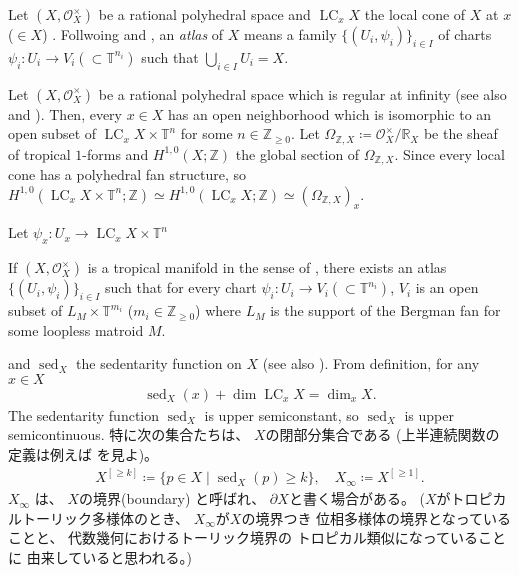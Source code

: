 \documentclass[a4paper,dvipdfmx,reqno,12pt]{amsart}
\theoremstyle{definition}
\newcommand{\deq}{\coloneqq}
\newcommand{\opn}[1]{\operatorname{#1}}
\numberwithin{equation}{section}
\begin{document}
Let $(X,\mathcal{O}_X^{\times})$ be a rational polyhedral space
and $\opn{LC}_x X$ the local cone of $X$ at $x$ ($\in X$)
\cite[]{MR4637248}.
Follwoing \cite[Definition 7.1.8]{mikhalkin2018tropical} and 
\cite[Definition 2.3]{demedrano2023chern},
an \emph{atlas} of $X$ means a family 
$\{(U_i,\psi_i)\}_{i\in I}$ of charts 
$\psi_i\colon U_i\to V_i (\subset \mathbb{T}^{n_i})$
\cite[Definition 2.2]{MR4637248}
such that $\bigcup_{i\in I}U_i=X$.

Let $(X,\mathcal{O}_X^{\times})$ be
a rational polyhedral space which is regular at
infinity \cite[]{MR4637248}
(see also \cite[Definition 1.2]{MR3330789}
and \cite[Definition 7.2.4]{mikhalkin2018tropical}).
Then, every $x\in X$ has an open neighborhood
which is isomorphic to an open subset of 
$\opn{LC}_x X\times \mathbb{T}^n$ for some
$n\in \mathbb{Z}_{\geq 0}$.
Let $\Omega_{\mathbb{Z},X}\deq
\mathcal{O}_X^{\times}/\mathbb{R}_X$ be
the sheaf of tropical $1$-forms and
$H^{1,0}(X;\mathbb{Z})$ the global section of 
$\Omega_{\mathbb{Z},X}$.
Since every local cone has a polyhedral fan structure,
so $H^{1,0}(\opn{LC}_x X\times \mathbb{T}^n;\mathbb{Z})
\simeq H^{1,0}(\opn{LC}_x X;\mathbb{Z})\simeq 
(\Omega_{\mathbb{Z},X})_x$.

Let $\psi_x\colon U_x \to \opn{LC}_x X\times \mathbb{T}^n$

If $(X,\mathcal{O}_X^{\times})$ is a tropical manifold
in the sense of \cite[Definition 6.1]{gross2019sheaftheoretic},
there exists an atlas $\{(U_i,\psi_i)\}_{i\in I}$
such that for every chart $\psi_i \colon U_i \to V_i 
(\subset \mathbb{T}^{n_i})$,
$V_i$ is an open subset of $L_M\times \mathbb{T}^{m_i}$
($m_i\in \mathbb{Z}_{\geq 0}$) where 
$L_M$ is the support of
the Bergman fan for some loopless matroid $M$.


and $\opn{sed}_X$ the sedentarity function on $X$
\cite[Definition 7.2.6]{mikhalkin2018tropical}
(see also \cite[Definition 2.4]{demedrano2023chern}).
From definition, for any $x\in X$
\begin{align}
\opn{sed}_X(x)+\dim \opn{LC}_x X=\dim_x X.
\end{align}
The sedentarity function
$\opn{sed}_X$ is upper semiconstant, so 
$\opn{sed}_X$ is upper semicontinuous.
特に次の集合たちは、
$X$の閉部分集合である
(上半連続関数の定義は例えば\cite[p.287]{MR463157}
を見よ)。
\begin{align}
X^{[\geq k]}\deq \{p\in X\mid \opn{sed}_X(p)\geq k\},
\quad 
X_{\infty}\deq X^{[\geq 1]}.
\end{align}
$X_{\infty}$ は、
$X$の境界(boundary)
と呼ばれ、
$\partial X$と書く場合がある。
($X$がトロピカルトーリック多様体のとき、
$X_{\infty}$が$X$の境界つき
位相多様体の境界となっていることと、
代数幾何におけるトーリック境界の
トロピカル類似になっていることに
由来していると思われる。)
\end{document}
